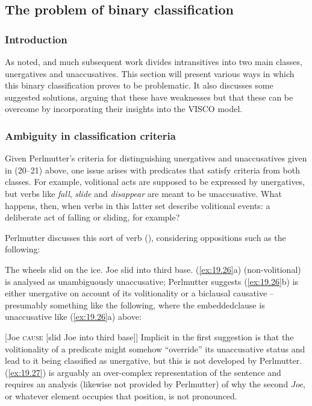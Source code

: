 \documentclass[output=paper]{langsci/langscibook}
\begin{document}
\subsection{The problem of binary classification}\label{sec:baker:3.4}

\subsubsection{Introduction}\label{sec:baker:3.4.1}

As noted, \citet{Perlmutter1978} and much subsequent work divides intransitives
into two main classes, unergatives and unaccusatives. This section will present
various ways in which this binary classification proves to be problematic. It
also discusses some suggested solutions, arguing that these have weaknesses but
that these can be overcome by incorporating their insights into the VISCO
model.

\subsubsection{Ambiguity in classification criteria}\label{sec:baker:3.4.2}

Given Perlmutter’s criteria for distinguishing unergatives and unaccusatives\linebreak
given in (20–21) above, one issue arises with predicates that satisfy criteria
from both classes. For example, volitional acts are supposed to be expressed by
unergatives, but verbs like \emph{fall}, \emph{slide} and
\emph{disappear} are meant to be unaccusative. What happens, then, when verbs
in this latter set describe volitional events: a deliberate act of falling or
sliding, for example?

Perlmutter discusses this sort of verb (\citeyear[163--164]{Perlmutter1978}),
considering oppositions such as the following:

\ea\label{ex:19.26}
    \ea The wheels slid on the ice.
    \ex Joe slid into third base. \parencite[163--164]{Perlmutter1978}
    \z
\z
(\ref{ex:19.26}a) (non-volitional) is analysed as unambiguously unaccusative;
Perlmutter suggests (\ref{ex:19.26}b) is either unergative on
account of its volitionality or a biclausal causative – presumably something
like the following, where the embedded\linebreak clause is
unaccusative like (\ref{ex:19.26}a) above:

\ea\label{ex:19.27}
    [Joe \textsc{cause} [slid Joe into third base]]
\z
Implicit in the first suggestion is that the volitionality of a predicate might
somehow \enquote{override} its unaccusative status and lead
to it being classified as unergative, but this is not
developed by Perlmutter. (\ref{ex:19.27}) is arguably an over-complex
representation of the sentence and requires an analysis (likewise not provided
by Perlmutter) of why the second \emph{Joe}, or whatever element occupies that
position, is not pronounced.
\end{document}
